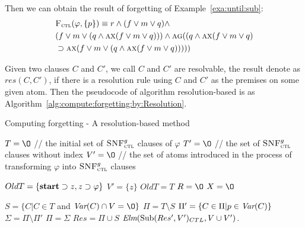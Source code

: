 \documentclass{article}
\begin{document}
Then we can obtain the result of forgetting of Example~\ref{exa:until:sub}:
\begin{align*}
& {\textsc{F}_{\textsc{ctl}}}(\varphi, \{p\}) \equiv r\wedge (f\vee m \vee q) \wedge \\
&  (f\vee m \vee (q\wedge \textsc{a}\textsc{x}(f\vee m\vee q))) \wedge \textsc{a}\textsc{g}((q\wedge \textsc{a}\textsc{x}(f\vee m\vee q)  \\
& \supset \textsc{a}\textsc{x}(f\vee m \vee (q\wedge \textsc{a}\textsc{x}(f\vee m\vee q)))))
\end{align*}

Given two clauses $C$ and $C'$, we call $C$ and $C'$ are resolvable, the result denote as $res(C,C')$, if there is a resolution rule using $C$ and $C'$ as the premises on some given atom.
Then the pseudocode of algorithm resolution-based is as Algorithm~\ref{alg:compute:forgetting:by:Resolution}.

\begin{algorithm}
\caption{Computing forgetting - A resolution-based method}%
\label{alg:compute:forgetting:by:Resolution}
$T={\O}$ // the initial set of ${\textsc{SNF}_{\textsc{ctl}}^g}$ clauses of $\varphi$ \;
$T' = {\O}$ // the set of ${\textsc{SNF}_{\textsc{ctl}}^g}$ clauses without index\;
$V'={\O}$ // the set of atoms introduced in the process of transforming $\varphi$ into ${\textsc{SNF}_{\textsc{ctl}}^g}$ clauses\;


$OldT=\{\textbf{start} \supset z, z \supset \varphi\}$\;
$V'=\{z\}$\;
 {
    $OldT=T$\;
    $R={\O}$\;
    $X={\O}$\;
}

$S=\{C | C\in T$ and $\Var(C) \cap V= {\O}\}$\;
$\Pi=T\setminus S$ \;
 {
    $\Pi'=\{C \in \Pi| p\in \textit{Var}(C)\}$ \;
    $\Sigma = \Pi \setminus \Pi'$\;
     {
    }
    $\Pi= \Sigma$\;
}
$Res=\Pi \cup S$\;
\Return $\textit{Elm}(\textrm{Sub}(Res', V')_{CTL}, V\cup V')$.
\end{algorithm}
\end{document}
